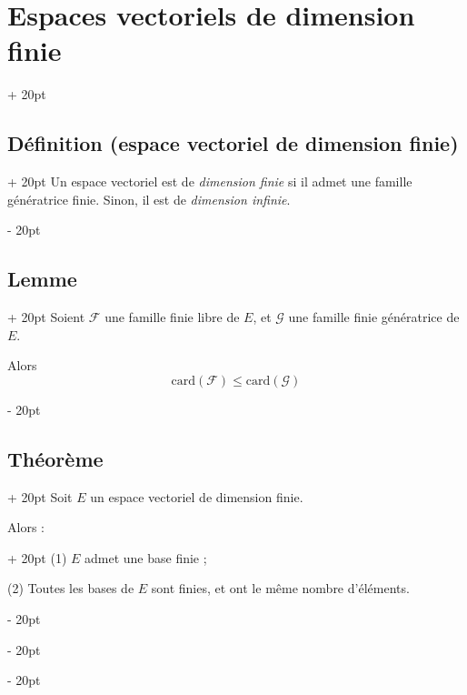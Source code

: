 \documentclass[a4paper, 12pt, twoside]{article}
\renewcommand{\le}{\leqslant}
\newcommand{\ind}[1][20pt]{\advance\leftskip + #1}
\newcommand{\deind}[1][20pt]{\advance\leftskip - #1}
\newenvironment{indt}[2][20pt]{#2 \par \ind[#1]}{\par \deind} %
\begin{document}
    \vspace{12pt}
    
    \begin{indt}{\section{Espaces vectoriels de dimension finie}}
        
        \begin{indt}{\subsection{Définition (espace vectoriel de dimension finie)}}
            Un espace vectoriel est de \textit{dimension finie} si il admet une famille génératrice finie. Sinon, il est de \textit{dimension infinie}.
        \end{indt}
        
        \vspace{12pt}
        
        \begin{indt}{\subsection{Lemme}}
            Soient $\mathcal F$ une famille finie libre de $E$, et $\mathcal G$ une famille finie génératrice de $E$.
            
            Alors
                \[ \mathrm{card}( \mathcal F) \le \mathrm{card}(\mathcal G) \]
        \end{indt}
        
        \vspace{12pt}
        
        \begin{indt}{\subsection{Théorème}}
            Soit $E$ un espace vectoriel de dimension finie.
            
            \begin{indt}{Alors :}
                (1) $E$ admet une base finie ;
                
                (2) Toutes les bases de $E$ sont finies, et ont le même nombre d'éléments.
            \end{indt}
        \end{indt}
        
        \vspace{12pt}
        

\end{indt}
\end{document}
